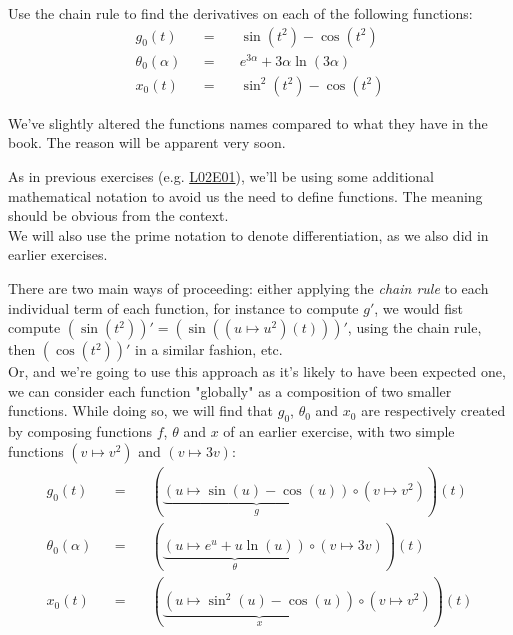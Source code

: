 \documentclass[solutions.tex]{subfiles}
\begin{document}
\maketitle
\begin{exercise} Use the chain rule to find the derivatives
on each of the following functions:
\begin{equation*} \begin{aligned}
	g_0(t) &&=\quad& \sin(t^2) - \cos(t^2) \\
	\theta_0(\alpha) &&=\quad& e^{3\alpha} + 3\alpha\ln(3\alpha) \\
	x_0(t) &&=\quad& \sin^2(t^2) - \cos(t^2)
\end{aligned} \end{equation*}
\end{exercise}
\begin{remark} We've slightly altered the functions names compared
to what they have in the book. The reason will be apparent very soon.
\end{remark}
\begin{remark} As in previous exercises (e.g.
\href{https://github.com/mbivert/ttm/blob/master/cm/L02E01.pdf}{L02E01}),
we'll be using some additional mathematical notation to avoid us
the need to define functions. The meaning should be obvious from the
context. \\

We will also use the prime notation to denote differentiation, as we also did
in earlier exercises.
\end{remark}
There are two main ways of proceeding: either applying the \textit{chain
rule} to each individual term of each function, for instance to
compute $g'$, we would fist compute $(\sin(t^2))' = (\sin((u \mapsto u^2)(t)))'$,
using the chain rule, then $(\cos(t^2))'$ in a similar fashion, etc. \\

Or, and we're going to use this approach as it's likely to have been
expected one, we can consider each function "globally" as
a composition of two smaller functions. While doing so, we will find
that $g_0$, $\theta_0$ and $x_0$ are respectively created by composing
functions $f$, $\theta$ and $x$ of an earlier exercise, with two simple
functions $(v \mapsto v^2)$ and $(v \mapsto 3v)$:
\begin{equation*} \begin{aligned}
	g_0(t) &&=\quad&
		(\underbrace{(u \mapsto \sin(u) - \cos(u))}_g\circ(v \mapsto v^2))(t) \\
	\theta_0(\alpha) &&=\quad&
		(\underbrace{(u \mapsto e^{u} + u\ln(u))}_\theta\circ(v \mapsto 3v))(t) \\
	x_0(t) &&=\quad&
		(\underbrace{(u \mapsto \sin^2(u) - \cos(u))}_x\circ(v \mapsto v^2))(t)
\end{aligned} \end{equation*}
\end{document}
